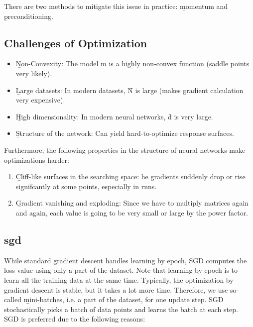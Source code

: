There are two methods to mitigate this issue in practice: \b{momentum} and \b{preconditioning}.



\subsection{Challenges of Optimization}
\begin{itemize}
    \item \b{Non-Convexity:} The model m is a highly non-convex function (saddle points very likely).
    \item \b{Large datasets:} In modern datasets, \f{N} is large (makes gradient calculation very expensive).
    \item \b{High dimensionality:} In modern neural networks, \f{d} is very large.
    \item \b{Structure of the network:} Can yield hard-to-optimize response surfaces.
\end{itemize}
Furthermore, the following properties in the structure of neural networks make optimizations harder:
\begin{enumerate}
    \item \b{Cliff-like surfaces in the searching space:} he gradients suddenly drop or rise signifcantly at some points, especially in \acp{rnn}.
    \item \b{Gradient vanishing and exploding:} Since we have to multiply matrices again and again, each value is going to be very small or large by the power factor.
\end{enumerate}

\subsection{\ac{sgd}}
While standard gradient descent handles learning by epoch, SGD computes the loss value using only a part of the dataset. Note that learning by epoch is to learn all the training data at the same time. Typically, the optimization by gradient descent is stable, but it takes a lot more time. Therefore, we use so-called \b{mini-batches}, i.e. a part of the dataset, for one update step. SGD stochastically picks a batch of data points and learns the batch at each step.\\
SGD is preferred due to the following reasons:

